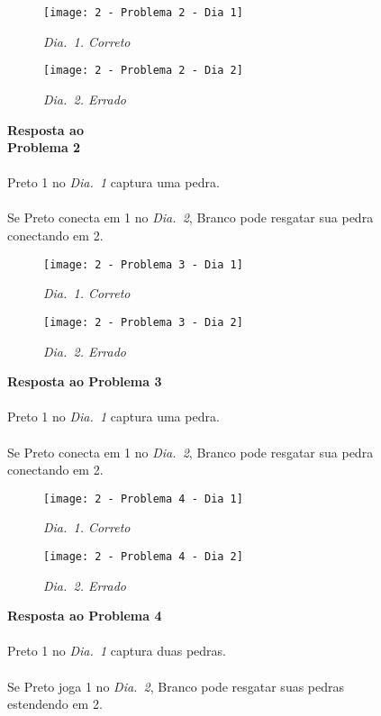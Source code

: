 \begin{SCfigure}[][h!]
    \begin{subfigure}[t]{.31\textwidth}
        \texttt{[image: 2 - Problema 2 - Dia 1]}
        \caption*{\emph{Dia.\@~1. Correto}}
    \end{subfigure}
    \hfill
    \begin{subfigure}[t]{.31\textwidth}
        \texttt{[image: 2 - Problema 2 - Dia 2]}
        \caption*{\emph{Dia.\@~2. Errado}}
    \end{subfigure}
    \hfill
    \caption*{\textbf{Resposta ao\\Problema 2}\\\\Preto 1 no \emph{Dia.\@~1} captura uma pedra.\\\\Se Preto conecta em 1 no \emph{Dia.\@~2}, Branco pode resgatar sua pedra conectando em 2.}
\end{SCfigure}

\vfill

\begin{SCfigure}[][h!]
    \begin{subfigure}[t]{.31\textwidth}
        \texttt{[image: 2 - Problema 3 - Dia 1]}
        \caption*{\emph{Dia.\@~1. Correto}}
    \end{subfigure}
    \hfill
    \begin{subfigure}[t]{.31\textwidth}
        \texttt{[image: 2 - Problema 3 - Dia 2]}
        \caption*{\emph{Dia.\@~2. Errado}}
    \end{subfigure}
    \hfill
    \caption*{\textbf{Resposta ao Problema 3}\\\\Preto 1 no \emph{Dia.\@~1} captura uma pedra.\\\\Se Preto conecta em 1 no \emph{Dia.\@~2}, Branco pode resgatar sua pedra conectando em 2.}
\end{SCfigure}

\pagebreak

\begin{SCfigure}[][h!]
    \begin{subfigure}[t]{.31\textwidth}
        \texttt{[image: 2 - Problema 4 - Dia 1]}
        \caption*{\emph{Dia.\@~1. Correto}}
    \end{subfigure}
    \hfill
    \begin{subfigure}[t]{.31\textwidth}
        \texttt{[image: 2 - Problema 4 - Dia 2]}
        \caption*{\emph{Dia.\@~2. Errado}}
    \end{subfigure}
    \hfill
    \caption*{\textbf{Resposta ao Problema 4}\\\\Preto 1 no \emph{Dia.\@~1} captura duas pedras.\\\\Se Preto joga 1 no \emph{Dia.\@~2}, Branco pode resgatar suas pedras estendendo em 2.}
\end{SCfigure}

